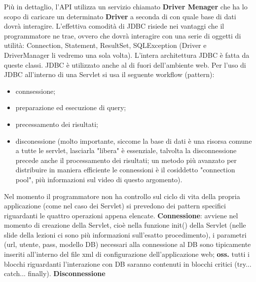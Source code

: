 Più in dettaglio, l'API utilizza un servizio chiamato \textbf{Driver Menager} che ha lo scopo di caricare un determinato \textbf{Driver} a seconda di con quale base di dati dovrà interagire.\newline
\newline
L'effettiva comodità di JDBC risiede nei vantaggi che il programmatore ne trae, ovvero che dovrà interagire con una serie di oggetti di utilità: Connection, Statement, ResultSet, SQLException (Driver e DriverManager li vedremo una sola volta). L'intera architettura JDBC è fatta da queste classi.\newline
\newline
JDBC è utilizzato anche al di fuori dell'ambiente web.\newline
\newline
Per l'uso di JDBC all'interno di una Servlet si usa il seguente workflow (pattern):
\begin{itemize}
    \item connsessione;
    \item preparazione ed esecuzione di query;
    \item precessamento dei risultati;
    \item disconessione (molto importante, siccome la base di dati è una risorsa comune a tutte le servlet, lasciarla "libera" è essenziale, talvolta la disconnessione precede anche il processamento dei risultati; un metodo più avanzato per distribuire in maniera efficiente le connessioni è il cosiddetto "connection pool", più informazioni sul video di questo argomento).
\end{itemize}
Nel momento il programmatore non ha controllo sul ciclo di vita della propria applicazione (come nel caso dei Servlet) si prevedono dei pattern specifici riguardanti le quattro operazioni appena elencate.\newline
\textbf{Connessione}: avviene nel momento di creazione della Servlet, cioè nella funzione init() della Servlet (nelle slide della lezioni ci sono più informazioni sull'esatto procedimento), i parametri (url, utente, pass, modello DB) necessari alla connessione al DB sono tipicamente inseriti all'interno del file xml di configurazione dell'applicazione web;\newline
\textbf{oss.} tutti i blocchi riguardanti l'interazione con DB saranno contenuti in blocchi critici (try... catch... finally).
\textbf{Disconnessione}